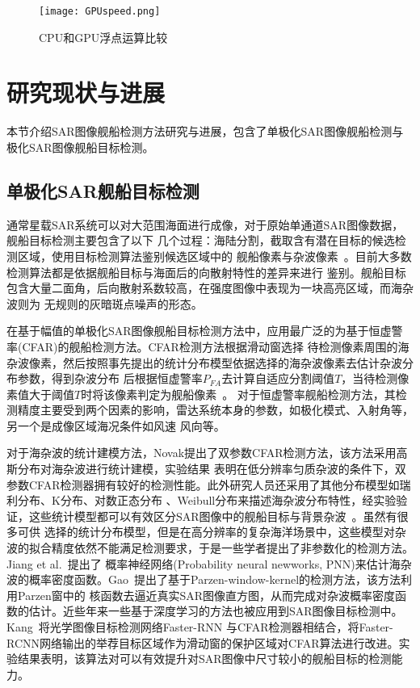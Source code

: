   \begin{figure}[H] %
    \centering
    \texttt{[image: GPUspeed.png]}
    \caption{CPU和GPU浮点运算比较}
    \label{fig:chap1:GPUspeed}
  \end{figure}

\section{研究现状与进展}
  本节介绍SAR图像舰船检测方法研究与进展，包含了单极化SAR图像舰船检测与极化SAR图像舰船目标检测。
\subsection{单极化SAR舰船目标检测}
    通常星载SAR系统可以对大范围海面进行成像，对于原始单通道SAR图像数据，舰船目标检测主要包含了以下
    几个过程：海陆分割，截取含有潜在目标的候选检测区域，使用目标检测算法鉴别候选区域中的
    舰船像素与杂波像素~\cite{article}。目前大多数检测算法都是依据舰船目标与海面后的向散射特性的差异来进行
    鉴别。舰船目标包含大量二面角，后向散射系数较高，在强度图像中表现为一块高亮区域，而海杂波则为
    无规则的灰暗斑点噪声的形态。

    在基于幅值的单极化SAR图像舰船目标检测方法中，应用最广泛的为基于恒虚警率(CFAR)的舰船检测方法。CFAR检测方法根据滑动窗选择
    待检测像素周围的海杂波像素，然后按照事先提出的统计分布模型依据选择的海杂波像素去估计杂波分布参数，得到杂波分布
    后根据恒虚警率$P_{FA}$去计算自适应分割阈值$T$，当待检测像素值大于阈值$T$时将该像素判定为舰船像素~\cite{王兆成2017基于单极化}。
    对于恒虚警率舰船检测方法，其检测精度主要受到两个因素的影响，雷达系统本身的参数，如极化模式、入射角等，另一个是成像区域海况条件如风速
    风向等。

    对于海杂波的统计建模方法，Novak\cite{Novak}提出了双参数CFAR检测方法，该方法采用高斯分布对海杂波进行统计建模，实验结果
    表明在低分辨率匀质杂波的条件下，双参数CFAR检测器拥有较好的检测性能。此外研究人员还采用了其他分布模型如瑞利分布、K分布、对数正态分布
    、Weibull分布来描述海杂波分布特性，经实验验证，这些统计模型都可以有效区分SAR图像中的舰船目标与背景杂波~\cite{Carretero2010Statistical}。虽然有很多可供
    选择的统计分布模型，但是在高分辨率的复杂海洋场景中，这些模型对杂波的拟合精度依然不能满足检测要求，于是一些学者提出了非参数化的检测方法。Jiang et al.~\cite{Q2000Automatic}提出了
    概率神经网络(Probability neural newworks, PNN)来估计海杂波的概率密度函数。Gao~\cite{Gao2011A}提出了基于Parzen-window-kernel的检测方法，该方法利用Parzen窗中的
    核函数去逼近真实SAR图像直方图，从而完成对杂波概率密度函数的估计。近些年来一些基于深度学习的方法也被应用到SAR图像目标检测中。Kang~\cite{Miao2017A}将光学图像目标检测网络Faster-RNN
    与CFAR检测器相结合，将Faster-RCNN网络输出的举荐目标区域作为滑动窗的保护区域对CFAR算法进行改进。实验结果表明，该算法对可以有效提升对SAR图像中尺寸较小的舰船目标的检测能力。

